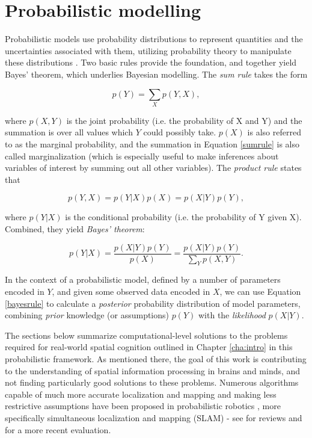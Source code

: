 \section{Probabilistic modelling}

Probabilistic models use probability distributions to represent quantities and the uncertainties associated with them, utilizing probability theory to manipulate these distributions \citep{ghahramani2015probabilistic}. Two basic rules provide the foundation, and together yield Bayes' theorem, which underlies Bayesian modelling. The \textit{sum rule} takes the form

\begin{equation}
\label{sumrule}
p(Y) = \sum_{X} p(Y, X),
\end{equation}

where $p(X,Y)$ is the joint probability (i.e. the probability of X and Y) and the summation is over all values which $Y$ could possibly take. $p(X)$ is also referred to as the marginal probability, and the summation in Equation \ref{sumrule} is also called marginalization (which is especially useful to make inferences about variables of interest by summing out all other variables). The \textit{product rule} states that

\begin{equation}
\label{productrule}
p(Y,X) = p(Y|X)p(X) = p(X|Y)p(Y),
\end{equation}

where $p(Y|X)$ is the conditional probability (i.e. the probability of Y given X). Combined, they yield \textit{Bayes' theorem}:

\begin{equation}
\label{bayesrule}
p(Y|X) = \frac{p(X|Y)p(Y)}{p(X)} = \frac{p(X|Y)p(Y)}{\sum_{Y} p(X, Y)}.
\end{equation}

In the context of a probabilistic model, defined by a number of parameters encoded in $Y$, and given some observed data encoded in $X$, we can use Equation \ref{bayesrule} to calculate a \textit{posterior} probability distribution of model parameters, combining \textit{prior} knowledge (or assumptions) $p(Y)$ with the \textit{likelihood} $p(X|Y)$.

The sections below summarize computational-level solutions to the problems required for real-world spatial cognition outlined in Chapter \ref{cha:intro} in this probabilistic framework. As mentioned there, the goal of this work is contributing to the understanding of spatial information processing in brains and minds, and not finding particularly good solutions to these problems. Numerous algorithms capable of much more accurate localization and mapping and making less restrictive assumptions have been proposed in probabilistic robotics \citep{thrun2005probabilistic}, more specifically simultaneous localization and mapping (SLAM) - see \citep{thrun2008simultaneous,durrant2006simultaneous,bailey2006simultaneous} for reviews and \citep{tuna2012evaluations} for a more recent evaluation. 

